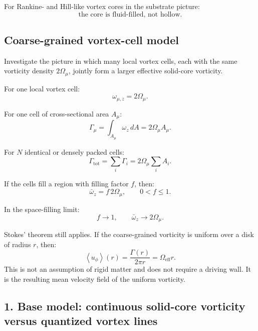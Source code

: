 \documentclass[11pt]{article}
\begin{document}
        For Rankine- and Hill-like vortex cores in the substrate picture:
        \[
        \boxed{
        \text{the core is fluid-filled, not hollow.}
        }
        \]

        
        \subsection{Coarse-grained vortex-cell model}
            
            Investigate the picture in which many local vortex cells, each with the same vorticity density \(2\Omega_{\mu}\), jointly form a larger effective solid-core vorticity.
            
            For one local vortex cell:
            \[
                \omega_{\mu,z}=2\Omega_{\mu}.
            \]
            
            For one cell of cross-sectional area \(A_{\mu}\):
            \[
                \Gamma_{\mu}
                =
                \int_{A_{\mu}}\omega_z\,dA
                =
                2\Omega_{\mu}A_{\mu}.
            \]
            
            For \(N\) identical or densely packed cells:
            \[
                \Gamma_{\mathrm{tot}}
                =
                \sum_i\Gamma_i
                =
                2\Omega_{\mu}\sum_i A_i.
            \]
            
            If the cells fill a region with filling factor \(f\), then:
            \[
                \bar{\omega}_z
                =
                f\,2\Omega_{\mu},
                \qquad
                0<f\leq1.
            \]
            
            In the space-filling limit:
            \[
                f\rightarrow1,
                \qquad
                \bar{\omega}_z\rightarrow2\Omega_{\mu}.
            \]
            
            Stokes' theorem still applies. If the coarse-grained vorticity is uniform over a disk of radius \(r\), then:
            \[
                \left\langle u_{\phi}\right\rangle(r)
                =
                \frac{\Gamma(r)}{2\pi r}
                =
                \Omega_{\mathrm{eff}}r.
            \]
            This is not an assumption of rigid matter and does not require a driving wall. It is the resulting mean velocity field of the uniform vorticity.
        
        \subsection{1. Base model: continuous solid-core vorticity versus quantized vortex lines}
            
\end{document}
